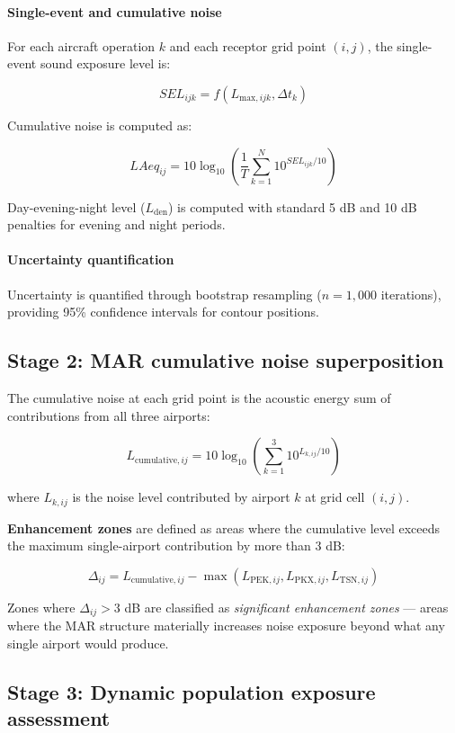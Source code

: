 \documentclass[review,12pt]{elsarticle}
\begin{document}
\paragraph{Single-event and cumulative noise}
For each aircraft operation $k$ and each receptor grid point $(i,j)$, the single-event sound exposure level is:

\[
SEL_{ijk} = f(L_{\text{max},ijk}, \Delta t_k)
\]

Cumulative noise is computed as:

\[
LAeq_{ij} = 10 \log_{10} \left( \frac{1}{T} \sum_{k=1}^{N} 10^{SEL_{ijk}/10} \right)
\]

Day-evening-night level ($L_{\text{den}}$) is computed with standard 5 dB and 10 dB penalties for evening and night periods.

\paragraph{Uncertainty quantification}
Uncertainty is quantified through bootstrap resampling ($n = 1,000$ iterations), providing 95\% confidence intervals for contour positions.

\subsection{Stage 2: MAR cumulative noise superposition}

The cumulative noise at each grid point is the acoustic energy sum of contributions from all three airports:

\[
L_{\text{cumulative},ij} = 10 \log_{10} \left( \sum_{k=1}^{3} 10^{L_{k,ij}/10} \right)
\]

where $L_{k,ij}$ is the noise level contributed by airport $k$ at grid cell $(i,j)$.

\textbf{Enhancement zones} are defined as areas where the cumulative level exceeds the maximum single-airport contribution by more than 3 dB:

\[
\Delta_{ij} = L_{\text{cumulative},ij} - \max(L_{\text{PEK},ij}, L_{\text{PKX},ij}, L_{\text{TSN},ij})
\]

Zones where $\Delta_{ij} > 3$ dB are classified as \textit{significant enhancement zones} --- areas where the MAR structure materially increases noise exposure beyond what any single airport would produce.

\subsection{Stage 3: Dynamic population exposure assessment}
\end{document}
